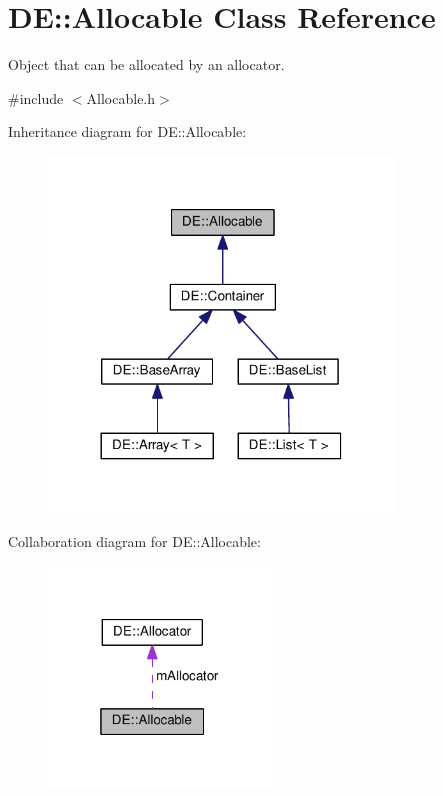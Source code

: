 \hypertarget{classDE_1_1Allocable}{}\section{DE\+:\+:Allocable Class Reference}
\label{classDE_1_1Allocable}


Object that can be allocated by an allocator.  




{\ttfamily \#include $<$Allocable.\+h$>$}



Inheritance diagram for DE\+:\+:Allocable\+:\nopagebreak
\begin{figure}[H]
\begin{center}
\leavevmode
\includegraphics[width=260pt]{classDE_1_1Allocable__inherit__graph}
\end{center}
\end{figure}


Collaboration diagram for DE\+:\+:Allocable\+:\nopagebreak
\begin{figure}[H]
\begin{center}
\leavevmode
\includegraphics[width=169pt]{classDE_1_1Allocable__coll__graph}
\end{center}
\end{figure}

